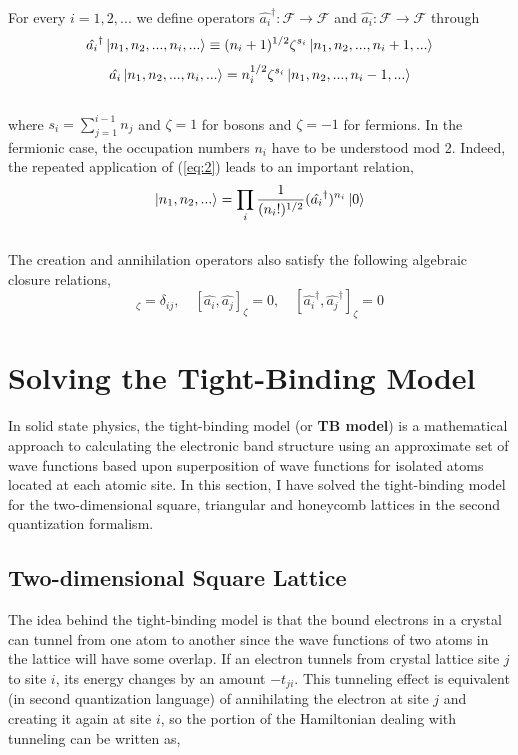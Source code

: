 \documentclass{article}
\begin{document}
For every $i = 1, 2, ...$ we define operators $\hat{a_i}^\dagger:\mathcal{F} \to \mathcal{F} $ and $\hat{a_i}:\mathcal{F} \to \mathcal{F} $ through
\begin{equation}\label{eq:2}
\hat{a_i}^\dagger \ket{n_1, n_2,...,n_i, ...} \equiv (n_i + 1)^{1/2} \zeta^{s_i}\ket{n_1, n_2, ..., n_i+1,...}
\end{equation}
\begin{equation}\label{eq:3}
\hat{a_i}\ket{n_1, n_2,...,n_i, ...} = n_i^{1/2} \zeta^{s_i}\ket{n_1, n_2, ..., n_i-1,...}
\end{equation}
\\
where $s_i = \sum_{j=1}^{i-1} n_j$ and $\zeta = 1$ for bosons and $\zeta = -1$ for fermions. In the fermionic case, the occupation numbers $n_i$ have to be understood mod 2. Indeed, the repeated application of (\ref{eq:2}) leads to an important relation,
\\
\begin{equation}
 \ket{n_1, n_2,...} = \prod_{i} \frac{1}{(n_i!)^{1/2}} (\hat{a_i}^\dagger)^{n_i} \ket{0}
\end{equation}
\\
The creation and annihilation operators also satisfy the following algebraic closure relations, 
\\
\begin{equation}
[\hat{a_i}, \hat{a_j}^\dagger]_\zeta=\delta_{ij}, \quad  [\hat{a_i}, \hat{a_j}]_\zeta = 0, \quad [\hat{a_i}^\dagger, \hat{a_j}^\dagger]_\zeta =0
\end{equation}

\section{Solving the Tight-Binding Model}
In solid state physics, the tight-binding model (or \textbf{TB model}) is a mathematical approach to calculating the electronic band structure using an approximate set of wave functions based upon superposition of wave functions for isolated atoms located at each atomic site. In this section, I have solved the tight-binding model for the two-dimensional square, triangular and honeycomb lattices in the second quantization formalism.

\subsection{Two-dimensional Square Lattice}
The idea behind the tight-binding model is that the bound electrons in a crystal can tunnel from one atom to another since the wave functions of two atoms in the lattice will have some overlap. If an electron tunnels from crystal lattice site $j$ to site $i$, its energy changes by an amount $-t_{ji}$. This tunneling effect is equivalent (in second quantization language) of annihilating the electron at site $j$ and creating it again at site $i$, so the portion of the Hamiltonian dealing with tunneling can be written as,
\end{document}
